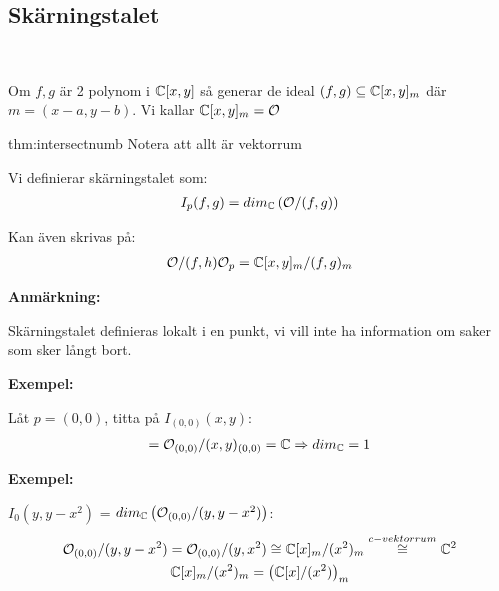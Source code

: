 \subsection{Skärningstalet}\hfill\\\par
\noindent Om $f,g$ är 2 polynom i $\mathbb{C}[x,y]$ så generar de ideal $(f,g)\subseteq\mathbb{C}[x,y]_m$ där $m = (x-a,y-b)$. Vi kallar $\mathbb{C}[x,y]_m = \mathcal{O}$
\par\bigskip
\begin{theo}[Skärningstal]{thm:intersectnumb}
  Notera att allt är vektorrum
  \par\bigskip
  \noindent Vi definierar skärningstalet som:
  \begin{equation*}
    \begin{gathered}
      I_p(f,g) = dim_{\mathbb{C}}\left(\mathcal{O}/(f,g)\right)
    \end{gathered}
  \end{equation*}\par
  \noindent Kan även skrivas på:
  \begin{equation*}
    \begin{gathered}
      \mathcal{O}/(f,h)\mathcal{O}_p = \mathbb{C}[x,y]_m/(f,g)_m
    \end{gathered}
  \end{equation*}
\end{theo}
\par\bigskip
\noindent\textbf{Anmärkning:}\par
\noindent Skärningstalet definieras lokalt i en punkt, vi vill inte ha information om saker som sker långt bort.
\par\bigskip
\noindent\textbf{Exempel:}\par
\noindent Låt $p=(0,0)$, titta på $I_{(0,0)}(x,y)$:
\begin{equation*}
  \begin{gathered}
    = \mathcal{O}_{(0,0)}/(x,y)_{(0,0)} = \mathbb{C} \Rightarrow dim_{\mathbb{C}} = 1
  \end{gathered}
\end{equation*}
\par\bigskip
\noindent\textbf{Exempel:}\par
\noindent $I_0(y,y-x^2)$ = $dim_{\mathbb{C}}\left(\mathcal{O}_{(0,0)}/(y,y-x^2)\right)$:
\begin{equation*}
  \begin{gathered}
    \mathcal{O}_{(0,0)}/(y,y-x^2) = \mathcal{O}_{(0,0)}/(y,x^2)\cong \mathbb{C}[x]_m/(x^2)_m\stackrel{c-vektorrum}{\cong}\mathbb{C}^2\\
    \mathbb{C}[x]_m/(x^2)_m = \left(\mathbb{C}[x]/(x^2)\right)_m
  \end{gathered}
\end{equation*}\par
